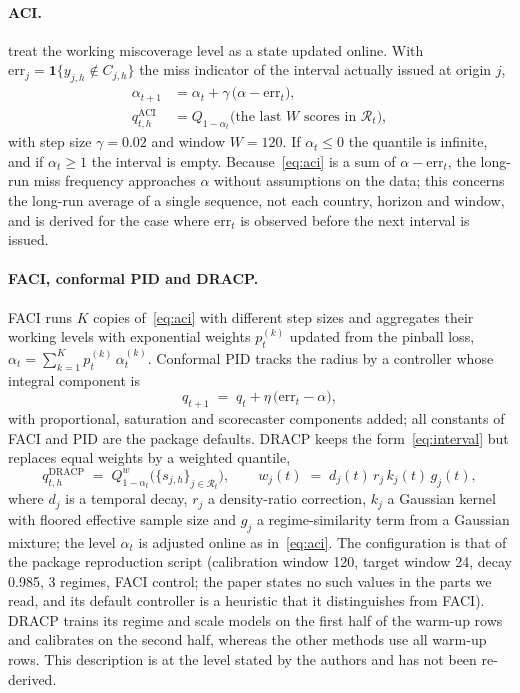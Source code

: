 \paragraph{ACI.} \citet{gibbs2021aci} treat the working miscoverage level as a state updated online. With $\mathrm{err}_{j}=\mathbf 1\{y_{j,h}\notin C_{j,h}\}$ the miss indicator of the interval actually issued at origin $j$,
\begin{align}
\alpha_{t+1} &= \alpha_t + \gamma\,\bigl(\alpha - \mathrm{err}_t\bigr), \label{eq:aci}\\
q^{\mathrm{ACI}}_{t,h} &= Q_{1-\alpha_t}\bigl(\text{the last } W \text{ scores in } \mathcal R_t\bigr), \label{eq:aciq}
\end{align}
with step size $\gamma=0.02$ and window $W=120$. If $\alpha_t\le 0$ the quantile is infinite, and if $\alpha_t\ge 1$ the interval is empty. Because~\eqref{eq:aci} is a sum of $\alpha-\mathrm{err}_t$, the long-run miss frequency approaches $\alpha$ without assumptions on the data; this concerns the long-run average of a single sequence, not each country, horizon and window, and is derived for the case where $\mathrm{err}_t$ is observed before the next interval is issued.

\paragraph{FACI, conformal PID and DRACP.} FACI \citep{gibbs2024faci} runs $K$ copies of~\eqref{eq:aci} with different step sizes and aggregates their working levels with exponential weights $p^{(k)}_t$ updated from the pinball loss, $\alpha_t=\sum_{k=1}^{K} p^{(k)}_t\,\alpha^{(k)}_t$. Conformal PID \citep{angelopoulos2023pid} tracks the radius by a controller whose integral component is
\begin{equation}\label{eq:pid}
q_{t+1} \;=\; q_t + \eta\,\bigl(\mathrm{err}_t-\alpha\bigr),
\end{equation}
with proportional, saturation and scorecaster components added; all constants of FACI and PID are the package defaults. DRACP \citep{oancea2026dracp} keeps the form~\eqref{eq:interval} but replaces equal weights by a weighted quantile,
\begin{equation}\label{eq:dracp}
q^{\mathrm{DRACP}}_{t,h} \;=\; Q^{w}_{1-\alpha_t}\bigl(\{s_{j,h}\}_{j\in\mathcal R_t}\bigr),\qquad
w_j(t) \;=\; d_j(t)\,r_j\,k_j(t)\,g_j(t),
\end{equation}
where $d_j$ is a temporal decay, $r_j$ a density-ratio correction, $k_j$ a Gaussian kernel with floored effective sample size and $g_j$ a regime-similarity term from a Gaussian mixture; the level $\alpha_t$ is adjusted online as in~\eqref{eq:aci}. The configuration is that of the package reproduction script (calibration window 120, target window 24, decay 0.985, 3 regimes, FACI control; the paper states no such values in the parts we read, and its default controller is a heuristic that it distinguishes from FACI). DRACP trains its regime and scale models on the first half of the warm-up rows and calibrates on the second half, whereas the other methods use all warm-up rows. This description is at the level stated by the authors and has not been re-derived.


